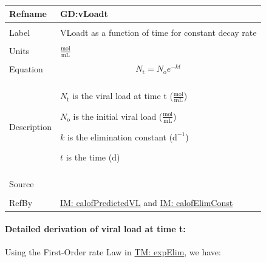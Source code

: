 \documentclass[12pt]{article}
\begin{document}
\vspace{\baselineskip}
\noindent
\begin{minipage}{\textwidth}
\begin{tabular}{>{\raggedright}p{}>{\raggedright\arraybackslash}p{}}
\toprule \textbf{Refname} & \textbf{GD:vLoadt}
\label{GD:vLoadt}
\\ \midrule \\
Label & VLoadt as a function of time for constant decay rate
        
\\ \midrule \\
Units & $\frac{\text{mol}}{\text{mL}}$
        
\\ \midrule \\
Equation & \begin{displaymath}
           {N_{\text{t}}}={N_{\text{o}}} e^{-k t}
           \end{displaymath}
\\ \midrule \\
Description & \begin{symbDescription}
              \item{${N_{\text{t}}}$ is the viral load at time t ($\frac{\text{mol}}{\text{mL}}$)}
              \item{${N_{\text{o}}}$ is the initial viral load ($\frac{\text{mol}}{\text{mL}}$)}
              \item{$k$ is the elimination constant ($\text{d}^{-1}$)}
              \item{$t$ is the time (${\text{d}}$)}
              \end{symbDescription}
\\ \midrule \\
Source & \cite{hobbie1970}
         
\\ \midrule \\
RefBy & \hyperref[IM:calofPredictedVL]{IM: calofPredictedVL} and \hyperref[IM:calofElimConst]{IM: calofElimConst}
        
\\ \bottomrule
\end{tabular}
\end{minipage}
\paragraph{Detailed derivation of viral load at time t:}
\label{GD:vLoadtDeriv}
Using the First-Order rate Law in \hyperref[TM:expElim]{TM: expElim}, we have:
\end{document}
